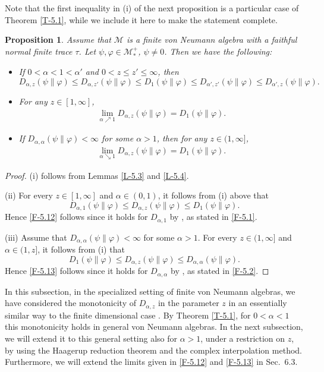 \documentclass[12pt]{article}
\newtheorem{prop}[theorem]{Proposition}
\theoremstyle{definition}
\theoremstyle{remark}
\numberwithin{equation}{section}
\def\Me{\mathcal M}
\def\ffi{\varphi}
\begin{document}
Note that the first inequality in (i) of the next proposition is a particular case of
Theorem \ref{T-5.1}, while we include it here to make the statement complete.

\begin{prop}\label{P-5.5}
Assume that $\Me$ is a finite von Neumann algebra with a faithful normal finite trace $\tau$.
Let $\psi,\ffi\in\Me_*^+$, $\psi\ne0$. Then we have the following:
\begin{itemize}
\item[(i)] If $0<\alpha<1<\alpha'$ and $0<z\le z'\le\infty$, then
\[
D_{\alpha,z}(\psi\|\ffi)\le D_{\alpha,z'}(\psi\|\ffi)\le D_1(\psi\|\ffi)
\le D_{\alpha',z'}(\psi\|\ffi)\le D_{\alpha',z}(\psi\|\ffi).
\]
\item[(ii)] For any $z\in[1,\infty]$,
\begin{align}\label{F-5.12}
\lim_{\alpha\nearrow1}D_{\alpha,z}(\psi\|\ffi)=D_1(\psi\|\ffi).
\end{align}
\item[(iii)] If $D_{\alpha,\alpha}(\psi\|\ffi)<\infty$ for some $\alpha>1$, then for any $z\in(1,\infty]$,
\begin{align}\label{F-5.13}
\lim_{\alpha\searrow1}D_{\alpha,z}(\psi\|\ffi)=D_1(\psi\|\ffi).
\end{align}
\end{itemize}
\end{prop}

\begin{proof}
(i) follows from Lemmas \ref{L-5.3} and \ref{L-5.4}.

(ii)\enspace
For every $z\in[1,\infty]$ and $\alpha\in(0,1)$, it follows from (i) above that
\[
D_{\alpha,1}(\psi\|\ffi)\le D_{\alpha,z}(\psi\|\ffi)\le D_1(\psi\|\ffi).
\]
Hence \eqref{F-5.12} follows since it holds for $D_{\alpha,1}$ by
\cite[Proposition 5.3(3)]{hiai2018quantum}, as stated in \eqref{F-5.1}.

(iii)\enspace
Assume that $D_{\alpha,\alpha}(\psi\|\ffi)<\infty$ for some $\alpha>1$. For every $z\in(1,\infty]$
and $\alpha\in(1,z]$, it follows from (i) that
\[
D_1(\psi\|\ffi)\le D_{\alpha,z}(\psi\|\ffi)\le D_{\alpha,\alpha}(\psi\|\ffi).
\]
Hence \eqref{F-5.13} follows since it holds for $D_{\alpha,\alpha}$ by
\cite[Proposition 3.8(ii)]{jencova2018renyi}, as stated in \eqref{F-5.2}.
\end{proof}

In this subsection, in the specialized setting of finite von Neumann algebras, we have considered the
monotonicity of $D_{\alpha,z}$ in the parameter $z$ in an essentially similar way to the finite dimensional
case \cite{lin2015investigating,mosonyi2023somecontinuity}. By Theorem
\ref{T-5.1}, for $0<\alpha<1$ this monotonicity holds in general von Neumann algebras. In the next
subsection, we will extend it to this general setting also for $\alpha>1$, under a
restriction on $z$, by using the Haagerup reduction theorem and the complex interpolation method. Furthermore,
we will extend the limits given in \eqref{F-5.12} and \eqref{F-5.13} in Sec.~6.3.
\end{document}
